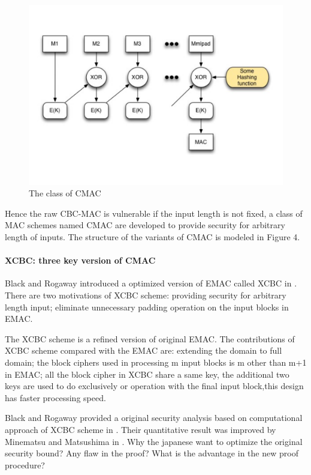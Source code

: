 \documentclass{article}
\begin{document}
\begin{figure}[htbp]
\centering
\includegraphics[scale=0.3]{./diagrams/cmac.pdf}
\caption{The class of CMAC}
\label{CMAC }
\end{figure}
Hence the raw CBC-MAC is vulnerable if the input length is not fixed, a class of MAC schemes named CMAC are developed to provide security for arbitrary length of inputs. The structure of the  variants of CMAC is modeled in Figure 4.
\paragraph{XCBC: three key version of CMAC }
Black and Rogaway introduced a optimized version of EMAC called XCBC in \cite{xcbc}.
There are two motivations of XCBC scheme: providing security for arbitrary length input; eliminate unnecessary padding operation on the input blocks in EMAC.

The XCBC scheme is a refined version of original EMAC. The contributions of XCBC scheme compared with the EMAC are: extending the domain to full domain; the block ciphers used in processing m input blocks is m other than m+1 in EMAC; all the block cipher in XCBC share a same key, the additional two keys are used to do exclusively or operation with the final input block,this design has faster processing speed.   

Black and Rogaway provided a original security analysis based on computational approach of XCBC scheme in \cite{xcbc}. Their quantitative result was improved by Minematsu and Matsushima in \cite{new}. 
Why the japanese want to optimize the original security bound? Any flaw in the proof? What is the advantage in the new proof procedure?
\end{document}
